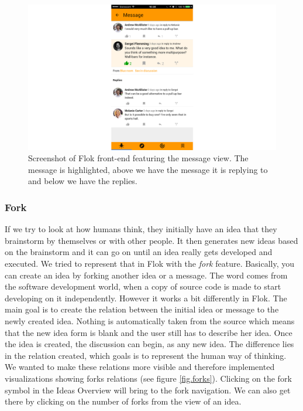 \documentclass[a4paper,12pt, oneside]{article}
\begin{document}
\begin{figure}[!htb]
\centering
\includegraphics[width=\textwidth]{images/messageView.png}
\caption{Screenshot of Flok front-end featuring the message view. The message is highlighted, above we have the message it is replying to and below we have the replies.}
\label{fig.messageView}
\end{figure}

\subsubsection{Fork}
\label{sec.fork}
If we try to look at how humans think, they initially have an idea that they brainstorm by themselves or with other people.
It then generates new ideas based on the brainstorm and it can go on until an idea really gets developed and executed.
We tried to represent that in Flok with the \emph{fork} feature.
Basically, you can create an idea by forking another idea or a message.
The word comes from the software development world, when a copy of source code is made to start developing on it independently.
However it works a bit differently in Flok.
The main goal is to create the relation between the initial idea or message to the newly created idea.
Nothing is automatically taken from the source which means that the new idea form is blank and the user still has to describe her idea.
Once the idea is created, the discussion can begin, as any new idea.
The difference lies in the relation created, which goals is to represent the human way of thinking.
We wanted to make these relations more visible and therefore implemented visualizations showing forks relations (see figure \ref{fig.forks}).
Clicking on the fork symbol in the Ideas Overview will bring to the fork navigation.
We can also get there by clicking on the number of forks from the view of an idea.
\end{document}
